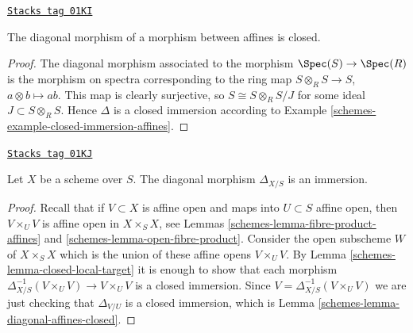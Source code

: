 \begin{lemma}
\label{schemes-lemma-diagonal-affines-closed}
\href{https://stacks.math.columbia.edu/tag/01KI}{\texttt{Stacks tag 01KI}}

The diagonal morphism of a morphism between affines is closed.
\end{lemma}

\begin{proof}

The diagonal morphism associated to the morphism
$\Spec(S) \to \Spec(R)$ is the morphism on spectra
corresponding to the ring
map $S \otimes_R S \to S$, $a \otimes b \mapsto ab$.
This map is clearly surjective, so $S \cong S \otimes_R S/J$
for some ideal $J \subset S \otimes_R S$. Hence
$\Delta$ is a closed immersion according to
Example \ref{schemes-example-closed-immersion-affines}.
\end{proof}

\begin{lemma}
\label{schemes-lemma-diagonal-immersion}
\href{https://stacks.math.columbia.edu/tag/01KJ}{\texttt{Stacks tag 01KJ}}


Let $X$ be a scheme over $S$.
The diagonal morphism $\Delta_{X/S}$ is an immersion.
\end{lemma}

\begin{proof}

Recall that if $V \subset X$ is affine open and maps into
$U \subset S$ affine open, then $V \times_U V$ is affine open
in $X \times_S X$, see Lemmas \ref{schemes-lemma-fibre-product-affines}
and \ref{schemes-lemma-open-fibre-product}.
Consider the open subscheme $W$ of $X \times_S X$ which
is the union of these affine opens $V \times_U V$.
By Lemma \ref{schemes-lemma-closed-local-target} it is enough
to show that each morphism
$\Delta_{X/S}^{-1}(V \times_U V) \to V \times_U V$ is
a closed immersion. Since $V = \Delta_{X/S}^{-1}(V \times_U V)$
we are just checking that $\Delta_{V/U}$ is a closed
immersion, which is Lemma \ref{schemes-lemma-diagonal-affines-closed}.
\end{proof}

